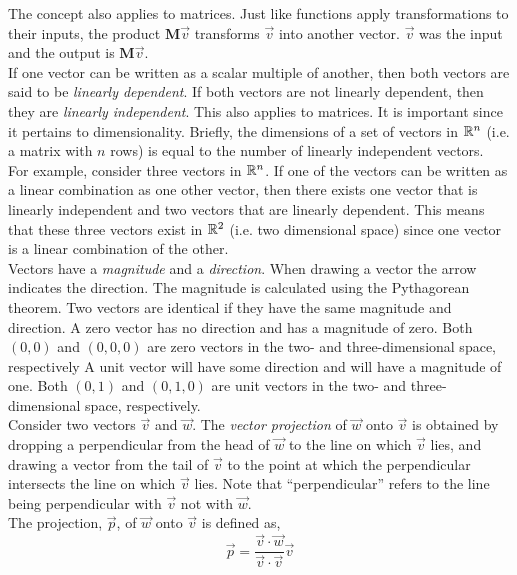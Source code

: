 \documentclass[12pt]{article}
\begin{document}
The concept also applies to matrices. Just like functions apply transformations to their inputs, the product $\mathbf{M}\vec{v}$ transforms $\vec{v}$ into another vector. $\vec{v}$ was the input and the output is $\mathbf{M}\vec{v}$. \\

If one vector can be written as a scalar multiple of another, then both vectors are said to be \emph{linearly dependent}. If both vectors are not linearly dependent, then they are \emph{linearly independent}. This also applies to matrices. It is important since it pertains to dimensionality. Briefly, the dimensions of a set of vectors in $\mathbb{R}^n$ (i.e. a matrix with $n$ rows) is equal to the number of linearly independent vectors. \\
 
For example, consider three vectors in $\mathbb{R}^n$. If one of the vectors can be written as a linear combination as one other vector, then there exists one vector that is linearly independent and two vectors that are linearly dependent. This means that these three vectors exist in $\mathbb{R}^2$ (i.e. two dimensional space) since one vector is a linear combination of the other. \\ 

Vectors have a \emph{magnitude} and a \emph{direction}. When drawing a vector the arrow indicates the direction. The magnitude is calculated using the Pythagorean theorem. Two vectors are identical if they have the same magnitude and direction. A zero vector has no direction and has a magnitude of zero. Both $(0,0)$ and $(0,0,0)$ are zero vectors in the two- and three-dimensional space, respectively A unit vector will have some direction and will have a magnitude of one. Both $(0,1)$ and $(0,1,0)$ are unit vectors in the two- and three- dimensional space, respectively. \\

Consider two vectors $\vec{v}$ and $\vec{w}$. The \emph{vector projection} of $\vec{w}$ onto $\vec{v}$ is obtained by dropping a perpendicular from the head of $\vec{w}$ to the line on which $\vec{v}$ lies, and drawing a vector from the tail of $\vec{v}$ to the point at which the perpendicular intersects the line on which $\vec{v}$ lies. Note that ``perpendicular'' refers to the line being perpendicular with $\vec{v}$ not with $\vec{w}$.\\

The projection, $\vec{p}$, of $\vec{w}$ onto $\vec{v}$ is defined as,
\[
\vec{p} = \frac{\vec{v}\cdot\vec{w}}{\vec{v}\cdot\vec{v}}\vec{v}
\]
\end{document}
